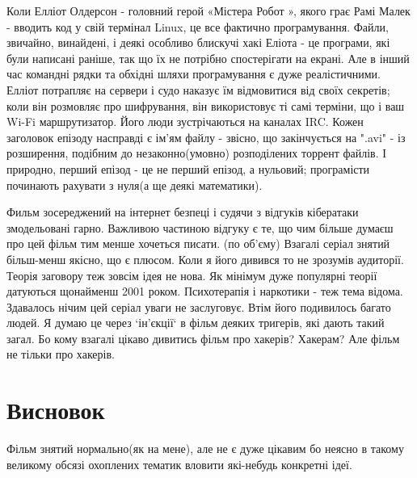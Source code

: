 \documentclass[a4paper,12pt]{article}
\begin{document}
    Коли Елліот Олдерсон - головний герой «Містера Робот », якого грає Рамі Малек - вводить код у свій термінал Linux,
    це все фактично програмування.
    Файли, звичайно, винайдені, і деякі особливо блискучі хакі Еліота - це програми, які були написані раніше,
    так що їх не потрібно спостерігати на екрані.
    Але в інший час командні рядки та обхідні шляхи програмування є дуже реалістичними.
    Елліот потрапляє на сервери і судо наказує їм відмовитися від своїх секретів; коли він розмовляє про шифрування,
    він використовує ті самі терміни, що і ваш Wi-Fi маршрутизатор.
    Його люди зустрічаються на каналах IRC. Кожен заголовок епізоду насправді є ім'ям файлу - звісно,
    що закінчується на ".avi" - із розширення, подібним до незаконно(умовно) розподілених торрент файлів.
    І природно, перший епізод - це не перший епізод, а нульовий; програмісти починають рахувати з нуля(а ще деякі математики).

    Фильм зосереджений на інтернет безпеці і судячи з відгуків кібератаки змодельовані гарно.
    Важливою частиною відгуку є те, що чим більше думаєш про цей фільм тим менше хочеться писати. (по об'єму)
    Взагалі серіал знятий більш-менш якісно, що є плюсом. Коли я його дивився то не зрозумів аудиторії.
    Теорія заговору теж зовсім ідея не нова. Як мінімум дуже популярні теорії датуються щонайменш 2001 роком.
    Психотерапія і наркотики - теж тема відома. Здавалось нічим цей серіал уваги не заслуговує.
    Втім його подивилось багато людей. Я думаю це через `ін'єкції` в фільм деяких тригерів, які дають такий загал.
    Бо кому взагалі цікаво дивитись фільм про хакерів? Хакерам? Але фільм не тільки про хакерів.

    \section{Висновок}
    Фільм знятий нормально(як на мене), але не є дуже цікавим бо неясно в такому великому обсязі охоплених тематик
    вловити які-небудь конкретні ідеї.
\end{document}

